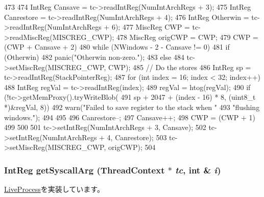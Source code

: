 \begin{DoxyCode}
473 {
474     IntReg Cansave = tc->readIntReg(NumIntArchRegs + 3);
475     IntReg Canrestore = tc->readIntReg(NumIntArchRegs + 4);
476     IntReg Otherwin = tc->readIntReg(NumIntArchRegs + 6);
477     MiscReg CWP = tc->readMiscReg(MISCREG_CWP);
478     MiscReg origCWP = CWP;
479     CWP = (CWP + Cansave + 2) %
480     while (NWindows - 2 - Cansave != 0) {
481         if (Otherwin) {
482             panic("Otherwin non-zero.\n");
483         } else {
484             tc->setMiscReg(MISCREG_CWP, CWP);
485             // Do the stores
486             IntReg sp = tc->readIntReg(StackPointerReg);
487             for (int index = 16; index < 32; index++) {
488                 IntReg regVal = tc->readIntReg(index);
489                 regVal = htog(regVal);
490                 if (!tc->getMemProxy().tryWriteBlob(
491                         sp + 2047 + (index - 16) * 8, (uint8_t *)&regVal, 8)) {
492                     warn("Failed to save register to the stack when "
493                             "flushing windows.\n");
494                 }
495             }
496             Canrestore--;
497             Cansave++;
498             CWP = (CWP + 1) %
499         }
500     }
501     tc->setIntReg(NumIntArchRegs + 3, Cansave);
502     tc->setIntReg(NumIntArchRegs + 4, Canrestore);
503     tc->setMiscReg(MISCREG_CWP, origCWP);
504 }
\end{DoxyCode}
\hypertarget{classSparc64LiveProcess_abab14482db5480cf54186cb10b08491e}{
\subsubsection[{getSyscallArg}]{\setlength{\rightskip}{0pt plus 5cm}IntReg getSyscallArg ({\bf ThreadContext} $\ast$ {\em tc}, \/  int \& {\em i})}}
\label{classSparc64LiveProcess_abab14482db5480cf54186cb10b08491e}


\hyperlink{classLiveProcess_aa001ff57ec460026facb89ba19c7bf96}{LiveProcess}を実装しています。


